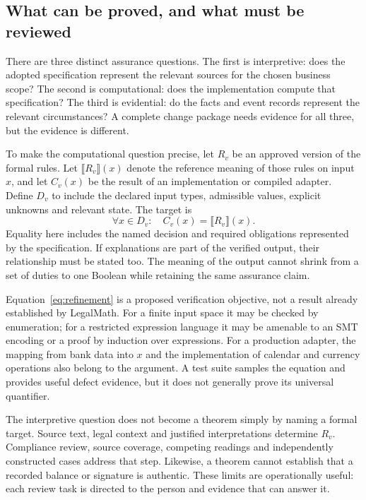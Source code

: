 

\subsection{What can be proved, and what must be reviewed}
\label{sec:proof}

There are three distinct assurance questions. The first is interpretive: does the
adopted specification represent the relevant sources for the chosen business
scope? The second is computational: does the implementation compute that
specification? The third is evidential: do the facts and event records represent
the relevant circumstances? A complete change package needs evidence for all
three, but the evidence is different.

To make the computational question precise, let $R_v$ be an approved version of
the formal rules. Let $\llbracket R_v\rrbracket(x)$ denote the reference meaning
of those rules on input $x$, and let $C_v(x)$ be the result of an implementation
or compiled adapter. Define $D_v$ to include the declared input types, admissible
values, explicit unknowns and relevant state. The target is
\begin{equation}
 \forall x\in D_v:\quad C_v(x)=\llbracket R_v\rrbracket(x).
 \label{eq:refinement}
\end{equation}
Equality here includes the named decision and required obligations represented by
the specification. If explanations are part of the verified output, their
relationship must be stated too. The meaning of the output cannot shrink from a
set of duties to one Boolean while retaining the same assurance claim.

Equation~\eqref{eq:refinement} is a proposed verification objective, not a result
already established by LegalMath. For a finite input space it may be checked by
enumeration; for a restricted expression language it may be amenable to an SMT
encoding or a proof by induction over expressions. For a production adapter,
the mapping from bank data into $x$ and the implementation of calendar and
currency operations also belong to the argument. A test suite samples the
equation and provides useful defect evidence, but it does not generally prove its
universal quantifier.

The interpretive question does not become a theorem simply by naming a formal
target. Source text, legal context and justified interpretations determine
$R_v$. Compliance review, source coverage, competing readings and independently
constructed cases address that step. Likewise, a theorem cannot establish that
a recorded balance or signature is authentic. These limits are operationally
useful: each review task is directed to the person and evidence that can answer it.

